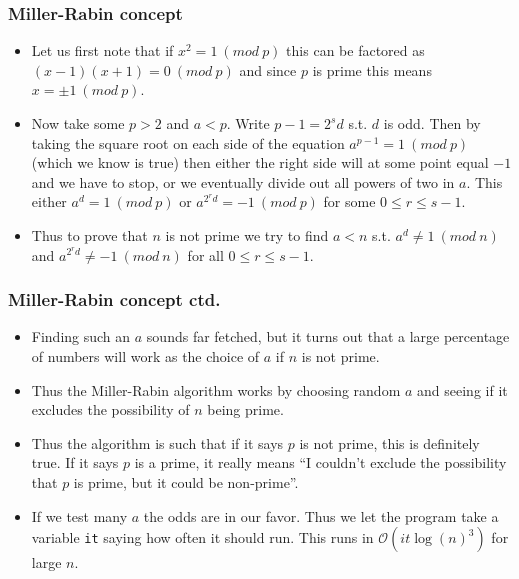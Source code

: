 \documentclass{beamer}
\begin{document}
\begin{frame}[plain]
\frametitle{Miller-Rabin concept}

\begin{itemize}

\item Let us first note that if $x^2 = 1 \ (mod \ p)$ this can be factored as $(x-1)(x+1) = 0 \ (mod \ p)$ and since $p$ is prime this means $x = \pm 1 \ (mod \ p)$.

\item Now take some $p > 2$ and $a < p$. Write $p - 1 = 2^sd$ s.t. $d$ is odd. Then by taking the square root on each side of the equation $a^{p - 1} = 1 \ (mod \ p)$ (which we know is true) then either the right side will at some point equal $-1$ and we have to stop, or we eventually divide out all powers of two in $a$. This either $a^d = 1 \ (mod \ p)$ or $a^{2^r d} = -1 \ (mod \ p)$ for some $0 \leq r \leq s - 1$.

\item Thus to prove that $n$ is not prime we try to find $a < n$ s.t. $a^d \neq 1 \ (mod \ n)$ and $a^{2^rd} \neq -1 \ (mod \ n)$ for all $0 \leq r \leq s - 1$.

\end{itemize}

\end{frame}

\begin{frame}[plain]
\frametitle{Miller-Rabin concept ctd.}

\begin{itemize}

    \item Finding such an $a$ sounds far fetched, but it turns out that a large percentage of numbers will work as the choice of $a$ if $n$ is not prime.
    \item Thus the Miller-Rabin algorithm works by choosing random $a$ and seeing if it excludes the possibility of $n$ being prime.

    \item Thus the algorithm is such that if it says $p$ is not prime, this is definitely true. If it says $p$ is a prime, it really means ``I couldn't exclude the possibility that $p$ is prime, but it could be non-prime''. 

    \item If we test many $a$ the odds are in our favor. Thus we let the program take a variable \texttt{it} saying how often it should run. This runs in $\mathcal{O}(it\log(n)^3)$ for large $n$.

\end{itemize}

\end{frame}
\end{document}
